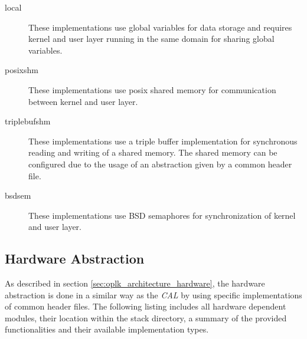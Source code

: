 \begin{description}
    \item[local] These implementations use global variables for data storage and requires kernel and user layer running in the same domain for sharing global variables.
    \item[posixshm] These implementations use posix shared memory for communication between kernel and user layer.
    \item[triplebufshm] These implementations use a triple buffer implementation for synchronous reading and writing of a shared memory.
    The shared memory can be configured due to the usage of an abstraction given by a common header file.
    \item[bsdsem] These implementations use BSD semaphores for synchronization of kernel and user layer.
\end{description}



\subsection{Hardware Abstraction}
\label{sec:oplk_platform_hardware}

As described in section \ref{sec:oplk_architecture_hardware}, the hardware abstraction is done in a similar way as the \emph{CAL} by using specific implementations of common header files.
The following listing includes all hardware dependent modules, their location within the stack directory, a summary of the provided functionalities and their available implementation types.

